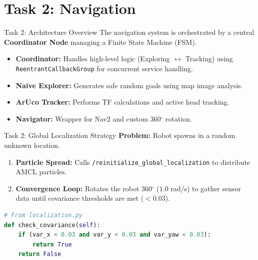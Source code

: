 \section{Task 2: Navigation}

\begin{frame}{Task 2: Architecture Overview}
    The navigation system is orchestrated by a central \textbf{Coordinator Node} managing a Finite State Machine (FSM).
    \vspace{0.2cm}
    \begin{itemize}
        \item \textbf{Coordinator:} Handles high-level logic (Exploring $\leftrightarrow$ Tracking) using \texttt{ReentrantCallbackGroup} for concurrent service handling.
        \item \textbf{Naive Explorer:} Generates safe random goals using map image analysis.
        \item \textbf{ArUco Tracker:} Performs TF calculations and active head tracking.
        \item \textbf{Navigator:} Wrapper for Nav2 and custom 360$^\circ$ rotation.
    \end{itemize}
\end{frame}

\begin{frame}[fragile]{Task 2: Global Localization Strategy}
    \textbf{Problem:} Robot spawns in a random unknown location.
    \begin{enumerate}
        \item \textbf{Particle Spread:} Calls \texttt{/reinitialize\_global\_localization} to distribute AMCL particles.
        \item \textbf{Convergence Loop:} Rotates the robot 360$^\circ$ ($1.0$ rad/s) to gather sensor data until covariance thresholds are met ($<0.03$).
    \end{enumerate}
    \begin{lstlisting}[language=Python]
# From localization.py
def check_covariance(self):
    if (var_x < 0.03 and var_y < 0.03 and var_yaw < 0.03):
        return True
    return False
    \end{lstlisting}
\end{frame}

